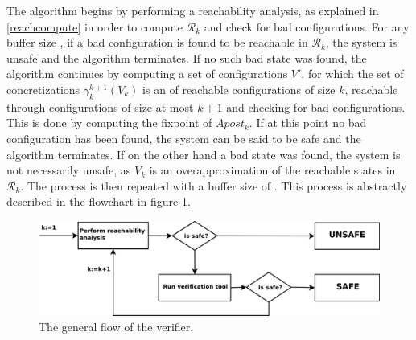 The algorithm begins by performing a reachability analysis, as explained in \ref{reachcompute} in order to compute $\mathcal{R}_k$ and check for bad configurations. For any buffer size , if a bad configuration is found to be reachable in $\mathcal{R}_k$, the system is unsafe and the algorithm terminates. If no such bad state was found, the algorithm continues by computing a set of configurations $V'$, for which the set of concretizations $\gamma_k^{k+1}(V_k)$ is an  of reachable configurations of size $k$, reachable through configurations of size at most $k+1$ and checking for bad configurations. This is done by computing the fixpoint of $Apost_k$. If at this point no bad configuration has been found, the system can be said to be safe and the algorithm terminates. If on the other hand a bad state was found, the system is not necessarily unsafe, as $V_k$ is an overapproximation of the reachable states in $\mathcal{R}_k$. The process is then repeated with a buffer size of . This process is abstractly described in the flowchart in figure \ref{flow}.

\begin{figure}
\includegraphics[width=400pt] {bilder/flowchart.png}
\caption{The general flow of the verifier.}
\label{flow}
\end{figure}

